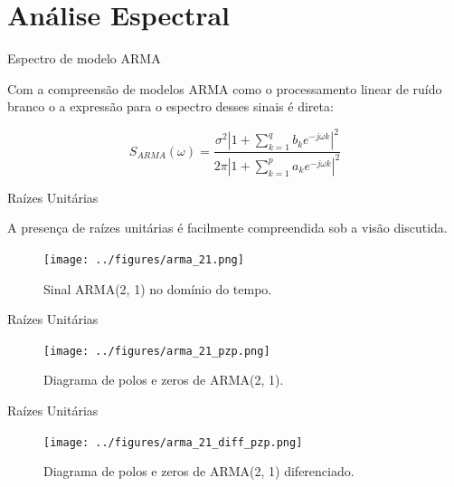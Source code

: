 \documentclass [xcolor=svgnames, t] {beamer}
\begin{document}
\vspace{5mm}

\section{Análise Espectral}

\begin{frame}{Espectro de modelo ARMA}

\vspace{5mm}

Com a compreensão de modelos ARMA como o processamento linear de ruído branco
o a expressão para o espectro desses sinais é direta:

\vspace{5mm}

\begin{equation}\label{eq:arma_spectrum}
     S_{ARMA}(\omega) = \frac{\sigma^2 |1 + \sum_{k=1}^{q} b_k e^{-j\omega k}|^2}{2\pi|1 + \sum_{k=1}^{p} a_k e^{-j\omega k}|^2}
\end{equation}

\end{frame}

\begin{frame}{Raízes Unitárias}

A presença de raízes unitárias é facilmente compreendida sob a visão discutida.

\begin{figure}[H]
    \centering
    \texttt{[image: ../figures/arma\_21.png]}
    \caption{Sinal ARMA(2, 1) no domínio do tempo.}
    \label{fig:arma_21}
\end{figure}


\end{frame}

\begin{frame}{Raízes Unitárias}


\begin{figure}[H]
    \centering
    \texttt{[image: ../figures/arma\_21\_pzp.png]}
    \caption{Diagrama de polos e zeros de ARMA(2, 1).}
\end{figure}


\end{frame}

\begin{frame}{Raízes Unitárias}


\begin{figure}[H]
    \centering
    \texttt{[image: ../figures/arma\_21\_diff\_pzp.png]}
    \caption{Diagrama de polos e zeros de ARMA(2, 1) diferenciado.}
\end{figure}


\end{frame}
\end{document}
